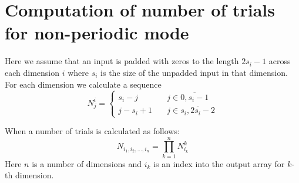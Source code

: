 \documentclass[reprint,amsmath,amssymb,aps,pre,showkeys,showpacs,nofootinbib]{revtex4-1}
\begin{document}
\appendix
\section{Computation of number of trials for non-periodic mode}
\label{sec:number-of-trials}
Here we assume that an input is padded with zeros to the length $2s_i - 1$
across each dimension $i$ where $s_i$ is the size of the unpadded input in that
dimension. For each dimension we calculate a sequence
\begin{equation*}
  N^i_j = \left\{
  \begin{array}{cc}
    s_i - j & \quad j \in \overline{0, s_i-1} \\
    j - s_i + 1 & \quad j \in \overline{s_i, 2s_i-2}
  \end{array}
  \right.
\end{equation*}

When a number of trials is calculated as follows:
\begin{equation*}
  N_{i_1, i_2, \dots, i_n} = \prod_{k=1}^n N^k_{i_k}
\end{equation*}
Here $n$ is a number of dimensions and $i_k$ is an index into the output array
for $k$-th dimension.


\end{document}
